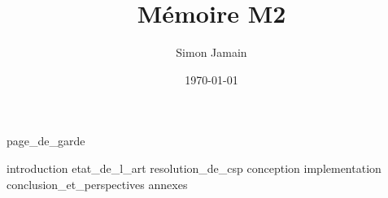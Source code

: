 \documentclass{report}
\title{Mémoire M2}
\author{Simon Jamain}
\date{\today}
\begin{document}
{page_de_garde}

\tableofcontents

{introduction}
{etat_de_l_art}
{resolution_de_csp}
{conception}
{implementation}
{conclusion_et_perspectives}
{annexes}
%
%

\printbibliography
\end{document}
